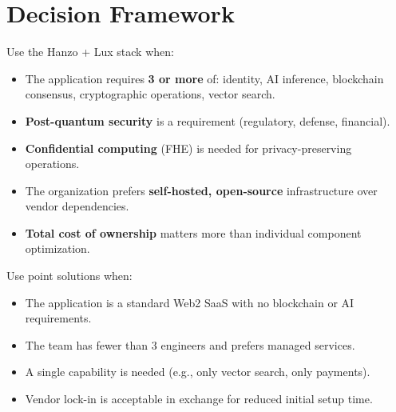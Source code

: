 \section{Decision Framework}

\label{sec:decision}

Use the Hanzo + Lux stack when:

\begin{itemize}
    \item The application requires \textbf{3 or more} of: identity, AI inference, blockchain consensus, cryptographic operations, vector search.
    \item \textbf{Post-quantum security} is a requirement (regulatory, defense, financial).
    \item \textbf{Confidential computing} (FHE) is needed for privacy-preserving operations.
    \item The organization prefers \textbf{self-hosted, open-source} infrastructure over vendor dependencies.
    \item \textbf{Total cost of ownership} matters more than individual component optimization.
\end{itemize}

Use point solutions when:

\begin{itemize}
    \item The application is a standard Web2 SaaS with no blockchain or AI requirements.
    \item The team has fewer than 3 engineers and prefers managed services.
    \item A single capability is needed (e.g., only vector search, only payments).
    \item Vendor lock-in is acceptable in exchange for reduced initial setup time.
\end{itemize}

